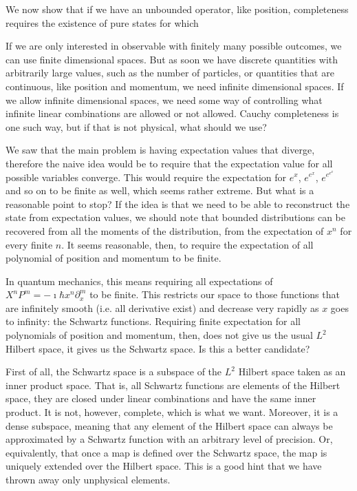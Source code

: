 \documentclass[10pt,twocolumn, nofootinbib]{revtex4-2}
\begin{document}
We now show that if we have an unbounded operator, like position, completeness requires the existence of pure states for which 

If we are only interested in observable with finitely many possible outcomes, we can use finite dimensional spaces. But as soon we have discrete quantities with arbitrarily large values, such as the number of particles, or quantities that are continuous, like position and momentum, we need infinite dimensional spaces. If we allow infinite dimensional spaces, we need some way of controlling what infinite linear combinations are allowed or not allowed. Cauchy completeness is one such way, but if that is not physical, what should we use?

We saw that the main problem is having expectation values that diverge, therefore the naive idea would be to require that the expectation value for all possible variables converge. This would require the expectation for $e^x$, $e^{e^x}$, $e^{e^{e^x}}$ and so on to be finite as well, which seems rather extreme. But what is a reasonable point to stop? If the idea is that we need to be able to reconstruct the state from expectation values, we should note that bounded distributions can be recovered from all the moments of the distribution, from the expectation of $x^n$ for every finite $n$. It seems reasonable, then, to require the expectation of all polynomial of position and momentum to be finite.

In quantum mechanics, this means requiring all expectations of $X^nP^m = -\imath \hbar x^n\partial_x ^m$ to be finite. This restricts our space to those functions that are infinitely smooth (i.e. all derivative exist) and decrease very rapidly as $x$ goes to infinity: the Schwartz functions. Requiring finite expectation for all polynomials of position and momentum, then, does not give us the usual $L^2$ Hilbert space, it gives us the Schwartz space. Is this a better candidate?

First of all, the Schwartz space is a subspace of the $L^2$ Hilbert space taken as an inner product space. That is, all Schwartz functions are elements of the Hilbert space, they are closed under linear combinations and have the same inner product. It is not, however, complete, which is what we want. Moreover, it is a dense subspace, meaning that any element of the Hilbert space can always be approximated by a Schwartz function with an arbitrary level of precision. Or, equivalently, that once a map is defined over the Schwartz space, the map is uniquely extended over the Hilbert space. This is a good hint that we have thrown away only unphysical elements.
\end{document}
